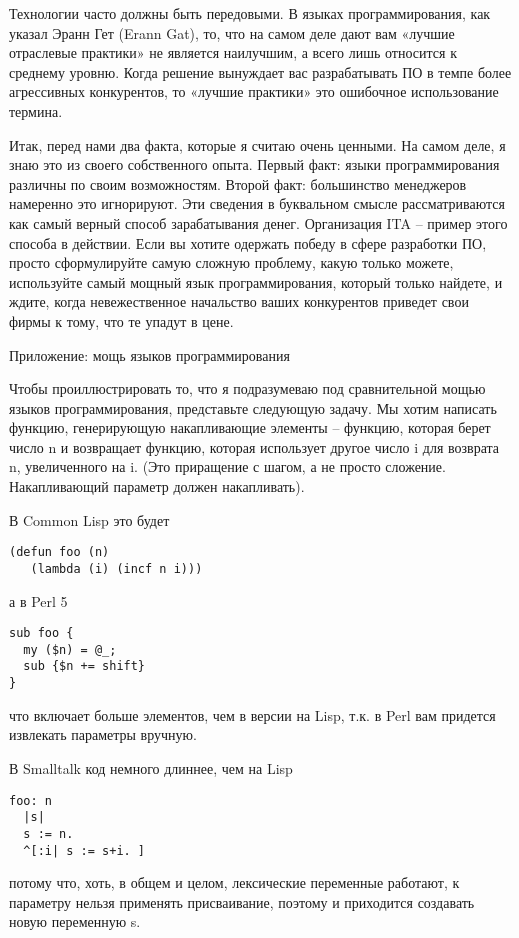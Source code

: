 \documentclass[ebook,12pt,oneside,openany]{memoir}
\begin{document}
Технологии часто должны быть передовыми. В языках программирования,
как указал Эранн Гет (Erann Gat), то, что на самом деле дают вам
«лучшие отраслевые практики» не является наилучшим, а всего лишь
относится к среднему уровню. Когда решение вынуждает вас разрабатывать
ПО в темпе более агрессивных конкурентов, то «лучшие практики» это
ошибочное использование термина.

Итак, перед нами два факта, которые я считаю очень ценными. На самом
деле, я знаю это из своего собственного опыта. Первый факт: языки
программирования различны по своим возможностям. Второй факт:
большинство менеджеров намеренно это игнорируют. Эти сведения в
буквальном смысле рассматриваются как самый верный способ
зарабатывания денег. Организация ITA – пример этого способа в
действии. Если вы хотите одержать победу в сфере разработки ПО, просто
сформулируйте самую сложную проблему, какую только можете, используйте
самый мощный язык программирования, который только найдете, и ждите,
когда невежественное начальство ваших конкурентов приведет свои фирмы
к тому, что те упадут в цене.

Приложение: мощь языков программирования

Чтобы проиллюстрировать то, что я подразумеваю под сравнительной мощью
языков программирования, представьте следующую задачу. Мы хотим
написать функцию, генерирующую накапливающие элементы – функцию,
которая берет число n и возвращает функцию, которая использует другое
число i для возврата n, увеличенного на i. (Это приращение с шагом, а
не просто сложение. Накапливающий параметр должен накапливать).

В Common Lisp это будет
\begin{verbatim}
(defun foo (n)
   (lambda (i) (incf n i)))
\end{verbatim}

а в Perl 5
\begin{verbatim}
sub foo {
  my ($n) = @_;
  sub {$n += shift}
}
\end{verbatim}


что включает больше элементов, чем в версии на Lisp, т.к. в Perl вам
придется извлекать параметры вручную.

В Smalltalk код немного длиннее, чем на Lisp
\begin{verbatim}
foo: n
  |s|
  s := n.
  ^[:i| s := s+i. ]
\end{verbatim}

потому что, хоть, в общем и целом, лексические переменные работают, к
параметру нельзя применять присваивание, поэтому и приходится
создавать новую переменную s.
\end{document}
